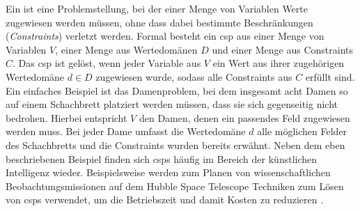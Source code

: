 Ein  ist eine Problemstellung, bei der einer Menge von Variablen Werte zugewiesen werden müssen, ohne dass dabei bestimmte Beschränkungen (\textit{Constraints}) 
verletzt werden. Formal besteht ein \ac*{csp} aus einer Menge von Variablen $V$, einer Menge aus Wertedomänen $D$ und einer Menge aus Constraints $C$. Das \ac*{csp} ist gelöst,
wenn jeder Variable aus $V$ ein Wert aus ihrer zugehörigen Wertedomäne $d \in D$ zugewiesen wurde, sodass alle Constraints aus $C$ erfüllt sind. Ein einfaches Beispiel ist das
Damenproblem, bei dem insgesamt acht Damen so auf einem Schachbrett platziert werden müssen, dass sie sich gegenseitig nicht bedrohen. Hierbei entspricht $V$ den Damen, denen
ein passendes Feld zugewiesen werden muss. Bei jeder Dame umfasst die Wertedomäne $d$ alle möglichen Felder des Schachbretts und die Constraints wurden bereits erwähnt. Neben
dem eben beschriebenen Beispiel finden sich \acp{csp} häufig im Bereich der künstlichen Intelligenz wieder. Beispielsweise werden zum Planen von wissenschaftlichen
Beobachtungsmissionen auf dem Hubble Space Telescope Techniken zum Lösen von \acp{csp} verwendet, um die Betriebszeit und damit Kosten zu reduzieren \cite{HubbleScheduling}.

